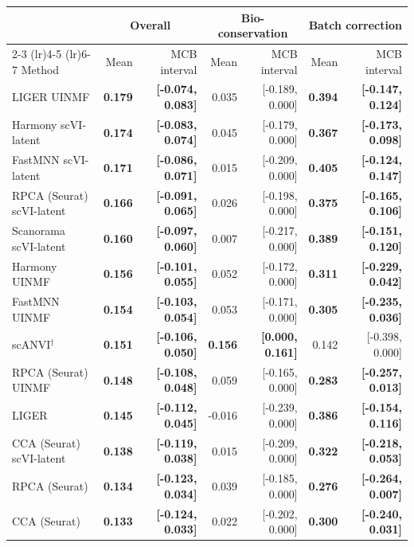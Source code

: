 \begin{tabular}{lrrrrrr}
\toprule
& \multicolumn{2}{c}{Overall} & \multicolumn{2}{c}{Bio-conservation} & \multicolumn{2}{c}{Batch correction} \\
\cmidrule(lr){2-3} \cmidrule(lr){4-5} \cmidrule(lr){6-7}
Method & Mean & MCB interval & Mean & MCB interval & Mean & MCB interval \\
\midrule
LIGER UINMF & \textbf{0.179} & \textbf{[-0.074, 0.083]} & 0.035 & [-0.189, 0.000] & \textbf{0.394} & \textbf{[-0.147, 0.124]} \\
Harmony scVI-latent & \textbf{0.174} & \textbf{[-0.083, 0.074]} & 0.045 & [-0.179, 0.000] & \textbf{0.367} & \textbf{[-0.173, 0.098]} \\
FastMNN scVI-latent & \textbf{0.171} & \textbf{[-0.086, 0.071]} & 0.015 & [-0.209, 0.000] & \textbf{0.405} & \textbf{[-0.124, 0.147]} \\
RPCA (Seurat) scVI-latent & \textbf{0.166} & \textbf{[-0.091, 0.065]} & 0.026 & [-0.198, 0.000] & \textbf{0.375} & \textbf{[-0.165, 0.106]} \\
Scanorama scVI-latent & \textbf{0.160} & \textbf{[-0.097, 0.060]} & 0.007 & [-0.217, 0.000] & \textbf{0.389} & \textbf{[-0.151, 0.120]} \\
Harmony UINMF & \textbf{0.156} & \textbf{[-0.101, 0.055]} & 0.052 & [-0.172, 0.000] & \textbf{0.311} & \textbf{[-0.229, 0.042]} \\
FastMNN UINMF & \textbf{0.154} & \textbf{[-0.103, 0.054]} & 0.053 & [-0.171, 0.000] & \textbf{0.305} & \textbf{[-0.235, 0.036]} \\
scANVI$^\dagger$ & \textbf{0.151} & \textbf{[-0.106, 0.050]} & \textbf{0.156} & \textbf{[0.000, 0.161]} & 0.142 & [-0.398, 0.000] \\
RPCA (Seurat) UINMF & \textbf{0.148} & \textbf{[-0.108, 0.048]} & 0.059 & [-0.165, 0.000] & \textbf{0.283} & \textbf{[-0.257, 0.013]} \\
LIGER & \textbf{0.145} & \textbf{[-0.112, 0.045]} & -0.016 & [-0.239, 0.000] & \textbf{0.386} & \textbf{[-0.154, 0.116]} \\
CCA (Seurat) scVI-latent & \textbf{0.138} & \textbf{[-0.119, 0.038]} & 0.015 & [-0.209, 0.000] & \textbf{0.322} & \textbf{[-0.218, 0.053]} \\
RPCA (Seurat) & \textbf{0.134} & \textbf{[-0.123, 0.034]} & 0.039 & [-0.185, 0.000] & \textbf{0.276} & \textbf{[-0.264, 0.007]} \\
CCA (Seurat) & \textbf{0.133} & \textbf{[-0.124, 0.033]} & 0.022 & [-0.202, 0.000] & \textbf{0.300} & \textbf{[-0.240, 0.031]} \\

\end{tabular}
